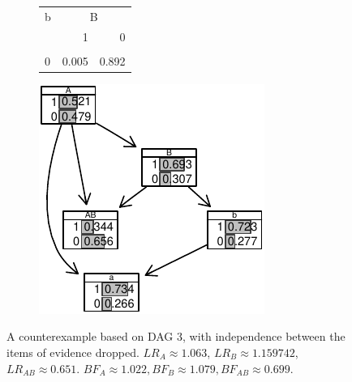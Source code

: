 \documentclass[
  10pt,
  dvipsnames,enabledeprecatedfontcommands]{scrartcl}
\begin{document}
\begin{figure}
\begin{subfigure}[ht!]{0.45\textwidth}
\begin{tabular}{lrr}
\toprule
\multicolumn{1}{c}{b} & \multicolumn{2}{c}{B} \\
  & 1 & 0\\
\midrule
\cellcolor{gray!6}{1} & \cellcolor{gray!6}{0.995} & \cellcolor{gray!6}{0.108}\\
0 & 0.005 & 0.892\\
\bottomrule
\end{tabular}

\normalsize 


\end{subfigure} 
\hspace{5mm}\begin{subfigure}{0.45\textwidth}

\begin{center}\includegraphics[width=1\linewidth]{conjunction-appendix13_files/figure-latex/unnamed-chunk-29-1} \end{center}
\end{subfigure} 
\caption{A counterexample based on \textsf{DAG 3}, with independence between the items of evidence dropped.   $LR_A  \approx 1.063$, $LR_B \approx 1.159742$,  $LR_{AB} \approx 0.651$. $BF_A \approx  1.022, BF_B \approx  1.079, BF_{AB}\approx   0.699$.}
\label{fig:CPTDoubleL}
\end{figure}
\end{document}
